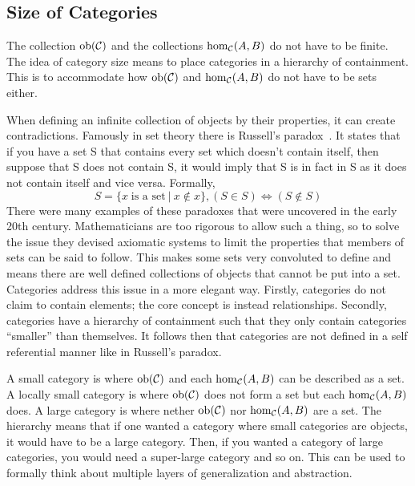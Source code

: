 \subsection{Size of Categories}

The collection $\operatorname{ob}(\mathcal{C})$ and the collections $\hom_\mathcal{C}(A,B)$
do not have to be finite. The idea of category size means to place categories in
a hierarchy of containment. This is to accommodate how $\operatorname{ob}(\mathcal{C})$ and
$\hom_\mathcal{C}(A,B)$ do not have to be sets either.

When defining an infinite collection of objects by their properties, it can
create contradictions. Famously in set theory there is Russell's
paradox~\autocite{Russell:1903}. It states that if you have a set S that
contains every set which doesn't contain itself, then suppose that S does not
contain S, it would imply that S is in fact in S as it does not contain itself
and vice versa. Formally, 
\begin{equation}
S = \{x\;\text{is a set}\:|\:x\notin x\}, (S\in S) \iff (S\notin S)
\end{equation}
There were many examples of these paradoxes that were uncovered in the early
20th century. Mathematicians are too rigorous to allow such a thing, so to solve
the issue they devised axiomatic systems to limit the properties that members of
sets can be said to follow. This makes some sets very convoluted to define and
means there are well defined collections of objects that cannot be put into a
set. Categories address this issue in a more elegant way. Firstly, categories do
not claim to contain elements; the core concept is instead relationships.
Secondly, categories have a hierarchy of containment such that they only contain
categories ``smaller'' than themselves. It follows then that categories are not
defined in a self referential manner like in Russell's paradox.

A small category is where $\operatorname{ob}(\mathcal{C})$ and each $\hom_\mathcal{C}(A,B)$
can be described as a set. A locally small category is where
$\operatorname{ob}(\mathcal{C})$ does not form a set but each $\hom_\mathcal{C}(A,B)$ does.
A large category is where nether $\operatorname{ob}(\mathcal{C})$ nor
$\hom_\mathcal{C}(A,B)$ are a set. The hierarchy means that if one wanted a
category where small categories are objects, it would have to be a large
category. Then, if you wanted a category of large categories, you would need a
super-large category and so on. This can be used to formally think about
multiple layers of generalization and abstraction.


